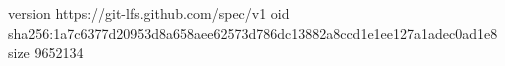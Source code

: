version https://git-lfs.github.com/spec/v1
oid sha256:1a7c6377d20953d8a658aee62573d786dc13882a8ccd1e1ee127a1adec0ad1e8
size 9652134
